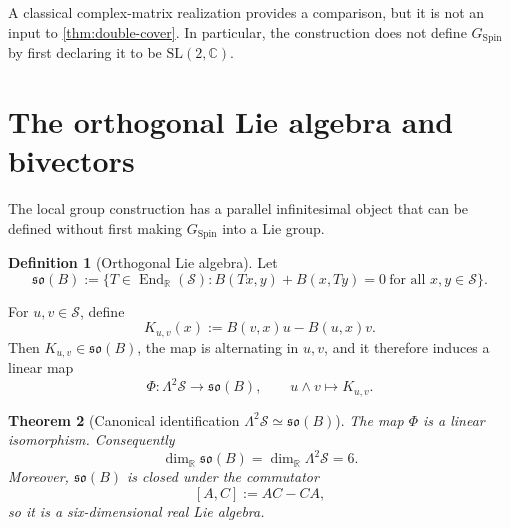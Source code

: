 \documentclass[11pt,a4paper]{article}
\newtheorem{theorem}{Theorem}[section]
\theoremstyle{definition}
\newtheorem{definition}[theorem]{Definition}
\theoremstyle{remark}
\newcommand{\R}{\mathbb{R}}
\newcommand{\Smodel}{\mathcal{S}}
\newcommand{\SpinG}{G_{\mathrm{Spin}}}
\newcommand{\End}{\operatorname{End}}
\newcommand{\soB}{\mathfrak{so}(B)}
\begin{document}
A classical complex-matrix realization provides a comparison, but
it is not an input to \cref{thm:double-cover}.  In particular,
the construction does not define \(\SpinG\) by first declaring it to be
\(\mathrm{SL}(2,\mathbb C)\).

\clearpage
\section{The orthogonal Lie algebra and bivectors}
\label{sec:lie}

The local group construction has a parallel infinitesimal object that can
be defined without first making \(\SpinG\) into a Lie group.

\begin{definition}[Orthogonal Lie algebra]
\label{def:gB}
Let
\[
   \soB
   :=
   \bigl\{
      T\in\End_{\R}(\Smodel):
      B(Tx,y)+B(x,Ty)=0
      \ \text{for all }x,y\in\Smodel
   \bigr\}.
\tag{4.1}
\]
\end{definition}

For \(u,v\in\Smodel\), define
\[
   K_{u,v}(x)
   :=
   B(v,x)u-B(u,x)v.
\tag{4.2}\label{eq:Kuv}
\]
Then \(K_{u,v}\in\soB\), the map is alternating in \(u,v\), and it therefore
induces a linear map
\[
   \Phi:\Lambda^{2}\Smodel\longrightarrow\soB,
   \qquad
   u\wedge v\longmapsto K_{u,v}.
\tag{4.3}
\]

\begin{theorem}[Canonical identification \(\Lambda^2\Smodel\simeq\soB\)]
\label{thm:bivector}
The map \(\Phi\) is a linear isomorphism.  Consequently
\[
   \dim_{\R}\soB
   =
   \dim_{\R}\Lambda^{2}\Smodel
   =6.
\tag{4.4}
\]
Moreover, \(\soB\) is closed under the commutator
\[
   [A,C]:=AC-CA,
\tag{4.5}
\]
so it is a six-dimensional real Lie algebra.
\end{theorem}
\end{document}
